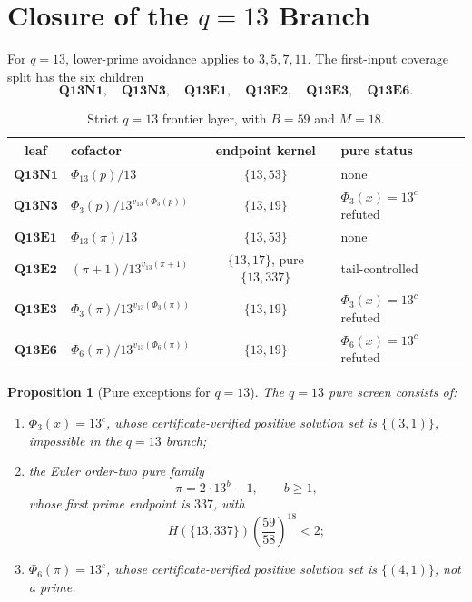 \documentclass[11pt]{article}
\newtheorem{proposition}[theorem]{Proposition}
\theoremstyle{definition}
\theoremstyle{remark}
\newcommand{\Hfun}{H}
\begin{document}
\section{Closure of the \(q=13\) Branch}
\label{sec:q13}

For \(q=13\), lower-prime avoidance applies to \(3,5,7,11\).  The first-input
coverage split has the six children
\[
  \mathbf{Q13N1},\quad \mathbf{Q13N3},\quad
  \mathbf{Q13E1},\quad \mathbf{Q13E2},\quad
  \mathbf{Q13E3},\quad \mathbf{Q13E6}.
\]

\begin{table}[ht]
\centering
\small
\begin{tabularx}{\textwidth}{c|>{\raggedright\arraybackslash}X|c|>{\raggedright\arraybackslash}p{}}
\toprule
leaf & cofactor & endpoint kernel & pure status\\
\midrule
\(\mathbf{Q13N1}\) & \(\Phi_{13}(p)/13\) & \(\{13,53\}\) & none\\
\(\mathbf{Q13N3}\) & \(\Phi_3(p)/13^{v_{13}(\Phi_3(p))}\) & \(\{13,19\}\) & \(\Phi_3(x)=13^c\) refuted\\
\(\mathbf{Q13E1}\) & \(\Phi_{13}(\pi)/13\) & \(\{13,53\}\) & none\\
\(\mathbf{Q13E2}\) & \((\pi+1)/13^{v_{13}(\pi+1)}\) & \(\{13,17\}\), pure \(\{13,337\}\) & tail-controlled\\
\(\mathbf{Q13E3}\) & \(\Phi_3(\pi)/13^{v_{13}(\Phi_3(\pi))}\) & \(\{13,19\}\) & \(\Phi_3(x)=13^c\) refuted\\
\(\mathbf{Q13E6}\) & \(\Phi_6(\pi)/13^{v_{13}(\Phi_6(\pi))}\) & \(\{13,19\}\) & \(\Phi_6(x)=13^c\) refuted\\
\bottomrule
\end{tabularx}
\caption{Strict \(q=13\) frontier layer, with \(B=59\) and \(M=18\).}
\label{tab:q13-frontier}
\end{table}

\begin{proposition}[Pure exceptions for \(q=13\)]
\label{prop:q13-pure}
The \(q=13\) pure screen consists of:
\begin{enumerate}[label=(\roman*),leftmargin=2.2em]
\item \(\Phi_3(x)=13^c\), whose certificate-verified positive solution set is
\(\{(3,1)\}\),
impossible in the \(q=13\) branch;
\item the Euler order-two pure family
\[
  \pi=2\cdot13^b-1,\qquad b\ge1,
\]
whose first prime endpoint is \(337\), with
\[
  \Hfun(\{13,337\})\left(\frac{59}{58}\right)^{18}<2;
\]
\item \(\Phi_6(\pi)=13^c\), whose certificate-verified positive solution set is
\(\{(4,1)\}\),
not a prime.
\end{enumerate}
\end{proposition}
\end{document}
